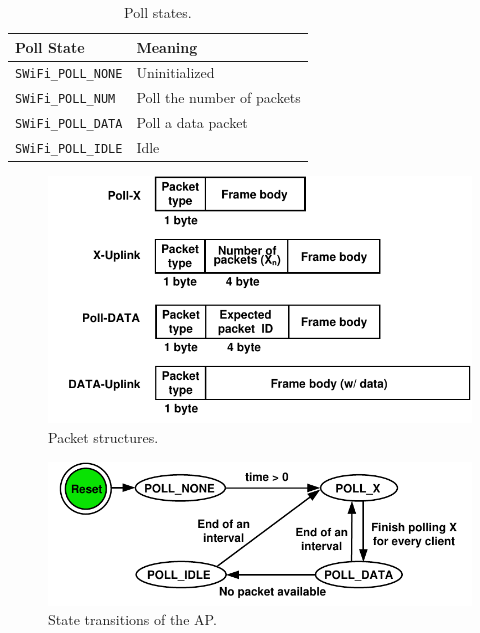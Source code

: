 \documentclass{article}
\begin{document}
\begin{table}[h!]
   \centering
   \caption{Poll states.}
   \label{tab:state}
   \begin{tabular}{| l | l |}
      \hline
      Poll State  &  Meaning\\ \hline
      \lstinline |SWiFi_POLL_NONE| & Uninitialized \\ \hline 
      \lstinline |SWiFi_POLL_NUM|  & Poll the number of packets\\ \hline 
      \lstinline |SWiFi_POLL_DATA| & Poll a data packet\\ \hline 
      \lstinline |SWiFi_POLL_IDLE| & Idle\\  
     \hline
   \end{tabular}
\end{table}

\begin{figure}[htbp]
\centering
\includegraphics[scale=0.6]{header.pdf}
\caption{Packet structures.}
\label{fig:packet}
\end{figure}


\begin{figure}[htbp]
\centering
\includegraphics[scale=0.8]{state_machine.pdf}
\caption{State transitions of the AP.}
\label{fig:state}
\end{figure}
\end{document}
